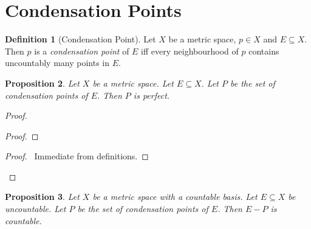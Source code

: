\documentclass{book}
\let\qed\relax
\newtheorem{prop}{Proposition}[chapter]
\theoremstyle{definition}
\newtheorem{df}[prop]{Definition}
\begin{document}
\section{Condensation Points}

\begin{df}[Condensation Point]
Let $X$ be a metric space, $p \in X$ and $E \subseteq X$. Then $p$ is a \emph{condensation point} of $E$ iff every neighbourhood of $p$ contains uncountably many points in $E$.
\end{df}

\begin{prop}
\label{prop:P_closed}
Let $X$ be a metric space. Let $E \subseteq X$. Let $P$ be the set of condensation points of $E$. Then $P$ is perfect.
\end{prop}

\begin{proof}
\pf
{}
\begin{proof}
\end{proof}
\begin{proof}
	\pf\ Immediate from definitions.
\end{proof}
\qed
\end{proof}

\begin{prop}
\label{prop:E_minus_P_countable}
Let $X$ be a metric space with a countable basis.
Let $E \subseteq X$ be uncountable. Let $P$ be the set of condensation points of $E$. Then $E - P$ is countable.
\end{prop}
\end{document}
